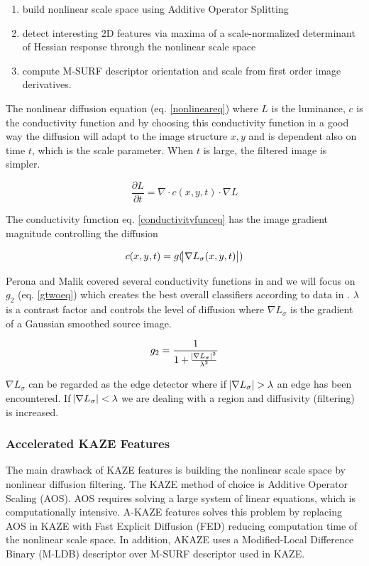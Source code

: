 \documentclass[english,12pt,a4paper,pdftex,elec,utf8]{aaltothesis}
\begin{document}
\begin{enumerate}
\item build nonlinear scale space using Additive Operator Splitting
\item detect interesting 2D features via maxima of a scale-normalized determinant of Hessian response through the nonlinear scale space
\item compute M-SURF descriptor orientation and scale from first order image derivatives.
\end{enumerate}

The nonlinear diffusion equation (eq. \ref{nonlineareq}) where $L$ is the luminance, $c$ is the conductivity function and by choosing this conductivity function in a good way the diffusion will adapt to the image structure $x, y$ and is dependent also on time $t$, which is the scale parameter. When $t$ is large, the filtered image is simpler. \cite{Alcantarilla2013}

\begin{equation}
  \label{nonlineareq}
  \frac{\partial L}{\partial t} = \nabla \cdot c(x,y,t)\cdot\nabla L
\end{equation}
\cite{Alcantarilla2012}

The conductivity function eq. \ref{conductivityfunceq} has the image gradient magnitude controlling the diffusion

\begin{equation}
  \label{conductivityfunceq}
c(x,y,t)=g(\abs{\nabla L_\sigma(x,y,t)})
\end{equation}

Perona and Malik covered several conductivity functions in \cite{Perona1990} and we will focus on $g_2$ (eq. \ref{gtwoeq}) which creates the best overall classifiers according to data in \cite{Alcantarilla2012}. $\lambda$ is a contrast factor and controls the level of diffusion where $\nabla L_{\sigma}$ is the gradient of a Gaussian smoothed source image.

\begin{equation}
  \label{gtwoeq}
g_2 = \frac{1}{1 + \frac{\abs{\nabla L_\sigma}^{2}}{\lambda^{2}}}
\end{equation}

$\nabla L_{\sigma}$ can be regarded as the edge detector where if $\abs{\nabla L_{\sigma}} > \lambda$ an edge has been encountered. If $\abs{\nabla L_{\sigma}} < \lambda$ we are dealing with a region and diffusivity (filtering) is increased. \cite{Weickert1998}

\subsubsection{Accelerated KAZE Features}
The main drawback of KAZE features is building the nonlinear scale space by nonlinear diffusion filtering.  The KAZE method of choice is Additive Operator Scaling (AOS). AOS requires solving a large system of linear equations, which is computationally intensive. A-KAZE features solves this problem by replacing AOS in KAZE with Fast Explicit Diffusion (FED) reducing computation time of the nonlinear scale space. In addition, AKAZE uses a Modified-Local Difference Binary (M-LDB) descriptor over M-SURF descriptor used in KAZE.
\end{document}
